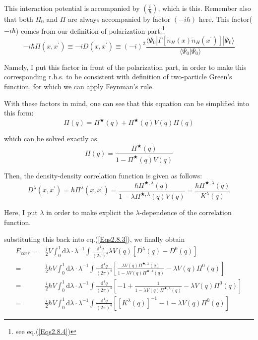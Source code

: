 This interaction potential is accompanied by $\left( \frac{i}{\hbar} \right)$, which is this. Remember also that both $\Pi_0$ and $\Pi$ are always accompanied by factor $(-i \hbar)$ here.
This factor($-i \hbar$) comes from our definition of polarization part:\footnote{see eq.(\ref{Eqs2.8.4})}
\[-i \hbar \Pi(x,x^{'})\equiv -i D(x,x^{'}) \equiv (-i)^2 \frac{\langle \Psi_0 | \Gamma[\tilde{n}_H(x)\tilde{n}_H(x^{'})]|\Psi_0\rangle}{\langle\Psi_0|\Psi_0\rangle}\]

Namely, I put this factor in front of the polarization part, in order to make this corresponding r.h.s. to be consistent with definition of two-particle Green's function, for which we can apply Feynman's rule.

With these factors in mind, one can see that this equation can be simplified into this form:
\begin{equation} \label{Eqs2.8.5}
\Pi(q) = \Pi^{\bigstar}(q)+\Pi^{\bigstar}(q) V(q) \Pi(q)
\end{equation}

which can be solved exactly as
\begin{equation*} \label{Eqs2.8.5'} \tag{2.8.5'} \Pi(q) = \frac{\Pi^{\bigstar}(q)}{1-\Pi^{\bigstar}(q) V(q)} \end{equation*}

Then, the density-density correlation function is given as follows:
\begin{equation} \label{Eqs2.8.6}
D^{\lambda}(x,x^{'}) = \hbar \Pi^{\lambda}(x,x^{'}) = \frac{\hbar \Pi^{\bigstar,\lambda}(q)}{1-\lambda\Pi^{\bigstar,\lambda}(q) V(q)} = \frac{\hbar \Pi^{\bigstar,\lambda}(q)}{K^{\lambda}(q)}
\end{equation}

Here, I put $\lambda$ in order to make explicit the $\lambda$-dependence of the correlation function.

substituting this back into eq.(\ref{Eqs2.8.3}), we finally obtain
\begin{eqnarray}
E_{corr} =& \frac{i}{2} V \int_0^1 \mathrm{d}\lambda \cdot \lambda^{-1} \int \frac{\mathrm{d}^4 q}{(2\pi)^4} \lambda V(q) [D^{\lambda}(q)-D^0(q)]\nonumber\\
=& \frac{i}{2} \hbar V \int_0^1 \mathrm{d}\lambda \cdot \lambda^{-1} \int \frac{\mathrm{d}^4 q}{(2\pi)^4} \left[ \frac{\lambda V(q)\Pi^{\bigstar,\lambda}(q)}{1-\lambda V(q)\Pi^{\bigstar,\lambda}(q)} - \lambda V(q)\Pi^0(q) \right] \label{Eqs2.8.7}\\
=& \frac{i}{2} \hbar V \int_0^1 \mathrm{d}\lambda \cdot \lambda^{-1} \int \frac{\mathrm{d}^4 q}{(2\pi)^4} \left[ -1 + \frac{1}{1-\lambda V(q)\Pi^{\bigstar,\lambda}(q)} - \lambda V(q)\Pi^0(q) \right] \nonumber\\
=&\frac{i}{2} \hbar V \int_0^1 \mathrm{d}\lambda \cdot \lambda^{-1} \int \frac{\mathrm{d}^4 q}{(2\pi)^4} \left[ \left[ K^{\lambda}(q) \right]^{-1} - 1 - \lambda V(q)\Pi^0(q) \right] \label{Eqs2.8.8}
\end{eqnarray}

